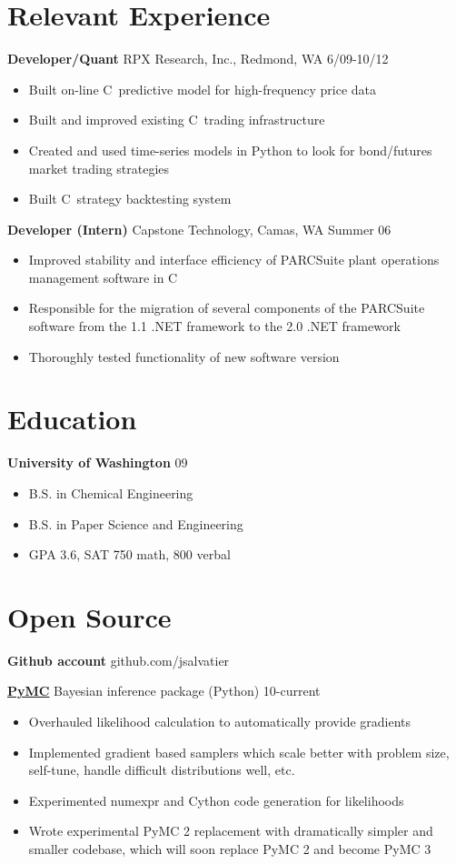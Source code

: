 \documentclass[margin]{res}
\newcommand{\bactivity}[3]{
  {\bf #1} #2 \hfill #3
    \vspace{6pt}
    \begin{itemize} \itemsep -2pt
      }
\newcommand{\eactivity}[0]{\end{itemize}}
\newcommand{\CS}
{C\nolinebreak[4]\hspace{-.05em}\raisebox{.22ex}{\footnotesize\bf \#}}
\begin{document}
 
 
\begin{resume} 
 

\section{Relevant Experience}
  \bactivity{Developer/Quant}{RPX Research, Inc., Redmond, WA}{6/09-10/12}
     \item Built on-line \CS\ predictive model for high-frequency price data
     \item Built and improved existing \CS\ trading infrastructure 
     \item Created and used time-series models in Python to look for bond/futures market trading strategies 
     \item Built \CS\ strategy backtesting system 
  \eactivity

    \bactivity{Developer (Intern)}{Capstone Technology, Camas, WA}{Summer 06}
    \item Improved stability and interface efficiency of PARCSuite plant operations management software in \CS\
    \item Responsible for the migration of several components of the PARCSuite software from the 1.1 .NET framework to the 2.0 .NET framework 
    \item Thoroughly tested functionality of new software version 
  \eactivity

 \section{Education} 
  \bactivity{University of Washington}{}{09}
      \item B.S. in Chemical Engineering
      \item B.S. in Paper Science and Engineering
      \item GPA 3.6, SAT 750 math, 800 verbal
  \eactivity
  
 \section{Open Source}
    {\bf Github account} github.com/jsalvatier 

    \bactivity{\href{https://github.com/pymc-devs/pymc\#readme}{PyMC} }{Bayesian inference package (Python)}{10-current}
      \item Overhauled likelihood calculation to automatically provide gradients 
      \item Implemented gradient based samplers which scale better with problem size, self-tune, handle difficult distributions well, etc.
      \item Experimented numexpr and Cython code generation for likelihoods
      \item Wrote experimental PyMC 2 replacement with dramatically simpler and smaller codebase, which will soon replace PyMC 2 and become PyMC 3
    \eactivity


\end{resume}
\end{document}
